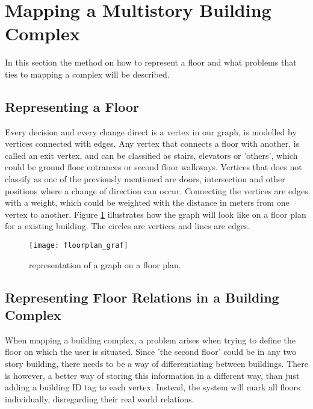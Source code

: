 
\section{Mapping a Multistory Building Complex}

In this section the method on how to represent a floor and what problems that ties to mapping a complex will be described.

\subsection{Representing a Floor}

Every decision and every change direct is a vertex in our graph, is modelled by vertices connected with edges. \label{e_vertex} Any vertex that connects a floor with another, is called an exit vertex, and can be classified as stairs, elevators or 'others', which could be ground floor entrances or second floor walkways. Vertices that does not classify as one of the previously mentioned are doors, intersection and other positions where a change of direction can occur. Connecting the vertices are edges with a weight, which could be weighted with the distance in meters from one vertex to another. Figure \ref{fig:floorplan_graf} illustrates how the graph will look like on a floor plan for a existing building. The circles are vertices and lines are edges.

\begin{figure}[ht!]
    \centering
    \texttt{[image: floorplan\_graf]}
    \caption{representation of a graph on a floor plan.}
    \label{fig:floorplan_graf}
  \end{figure}

\subsection{Representing Floor Relations in a Building Complex}

When mapping a building complex, a problem arises when trying to define the floor on which the user is situated. Since 'the second floor' could be in any two story building, there needs to be a way of differentiating between buildings. There is however, a better way of storing this information in a different way, than just adding a building ID tag to each vertex. Instead, the system will mark all floors individually, disregarding their real world relations.

